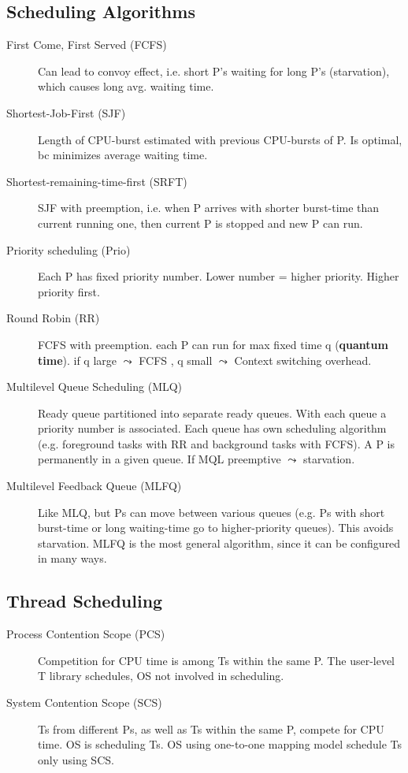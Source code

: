 \subsection*{Scheduling Algorithms}
\begin{description}
  \item[First Come, First Served (FCFS)] Can lead to convoy effect, i.e. short P's waiting for long P's (starvation), which causes long avg. waiting time.
  \item[Shortest-Job-First (SJF)] Length of CPU-burst estimated with previous CPU-bursts of P. Is optimal, bc minimizes average waiting time.
  \item[Shortest-remaining-time-first (SRFT)] SJF with preemption, i.e. when P arrives with shorter burst-time than current running one, then current P is stopped and new P can run.
  \item[Priority scheduling (Prio)] Each P has fixed priority number. Lower number = higher priority. Higher priority first.
  \item[Round Robin (RR)] FCFS with preemption. each P can run for max fixed time q (\textbf{quantum time}). if q large $\leadsto$ FCFS , q small $\leadsto$ Context switching overhead.
  \item[Multilevel Queue Scheduling (MLQ)] Ready queue partitioned into separate ready queues. With each queue a priority number is associated. Each queue has own scheduling algorithm (e.g. foreground tasks with RR and background tasks with FCFS). A P is permanently in a given queue. If MQL preemptive $\leadsto$ starvation.
  \item[Multilevel Feedback Queue (MLFQ)] Like MLQ, but Ps can move between various queues (e.g. Ps with short burst-time or long waiting-time go to higher-priority queues). This avoids starvation. MLFQ is the most general algorithm, since it can be configured in many ways.
\end{description}

\subsection*{Thread Scheduling}
\begin{description}
  \item[Process Contention Scope (PCS)] Competition for CPU time is  among Ts within the same P. The user-level T library schedules, OS not involved in scheduling.
  \item[System Contention Scope (SCS)] Ts from different Ps, as well as Ts within the same P, compete for CPU time. OS is scheduling Ts. OS using one-to-one mapping model schedule Ts only using SCS.
\end{description}


